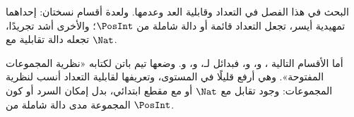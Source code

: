 \documentclass[../../../include/open-logic-chapter]{subfiles}
\begin{document}

\begin{editorial}
البحث في هذا الفصل في التعداد وقابلية العد وعدمها. ولعدة أقسام
نسختان: إحداهما تمهيدية أيسر، تجعل التعداد قائمة أو دالة شاملة
من $\PosInt$؛ والأخرى أشد تجريدًا، تجعله دالة تقابلية مع $\Nat$.
\end{editorial}











\begin{editorial}
أما الأقسام التالية ،
و، و،
فبدائل لـ، و،
و. وضعها تيم باتن لكتابه «نظرية المجموعات
المفتوحة». وهي أرفع قليلًا في المستوى، وتعريفها لقابلية التعداد
أنسب لنظرية المجموعات: وجود تقابل مع $\Nat$ أو مع مقطع ابتدائي،
بدل إمكان السرد أو كون المجموعة مدى دالة شاملة من $\PosInt$.
\end{editorial}


\OLEndChapterHook
\end{document}
